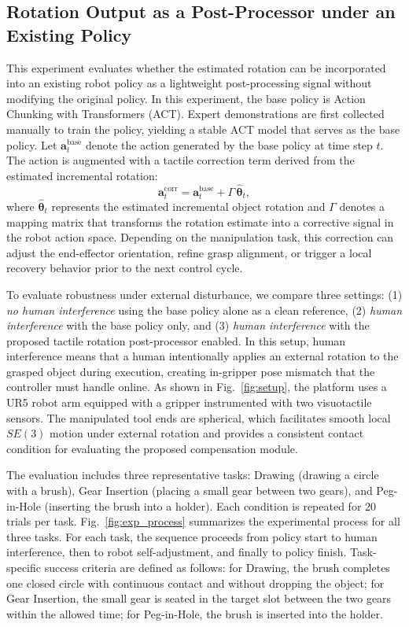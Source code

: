 \documentclass[letterpaper,10pt,journal,twoside]{IEEEtran}
\begin{document}
\subsection{Rotation Output as a Post-Processor under an Existing Policy}
\label{subsec:exp2}

This experiment evaluates whether the estimated rotation can be incorporated into an existing robot policy as a lightweight post-processing signal without modifying the original policy. In this experiment, the base policy is Action Chunking with Transformers (ACT). Expert demonstrations are first collected manually to train the policy, yielding a stable ACT model that serves as the base policy. Let $\mathbf{a}^{\mathrm{base}}_t$ denote the action generated by the base policy at time step $t$. The action is augmented with a tactile correction term derived from the estimated incremental rotation:
\begin{equation}
\mathbf{a}^{\mathrm{corr}}_t 
= 
\mathbf{a}^{\mathrm{base}}_t 
+ 
\Gamma \, \hat{\boldsymbol{\theta}}_t ,
\end{equation}
where $\hat{\boldsymbol{\theta}}_t$ represents the estimated incremental object rotation and $\Gamma$ denotes a mapping matrix that transforms the rotation estimate into a corrective signal in the robot action space. Depending on the manipulation task, this correction can adjust the end-effector orientation, refine grasp alignment, or trigger a local recovery behavior prior to the next control cycle.

To evaluate robustness under external disturbance, we compare three settings: (1) \emph{no human interference} using the base policy alone as a clean reference, (2) \emph{human interference} with the base policy only, and (3) \emph{human interference} with the proposed tactile rotation post-processor enabled. In this setup, human interference means that a human intentionally applies an external rotation to the grasped object during execution, creating in-gripper pose mismatch that the controller must handle online. As shown in Fig.~\ref{fig:setup}, the platform uses a UR5 robot arm equipped with a gripper instrumented with two visuotactile sensors. The manipulated tool ends are spherical, which facilitates smooth local $SE(3)$ motion under external rotation and provides a consistent contact condition for evaluating the proposed compensation module.

The evaluation includes three representative tasks: Drawing (drawing a circle with a brush), Gear Insertion (placing a small gear between two gears), and Peg-in-Hole (inserting the brush into a holder). Each condition is repeated for 20 trials per task. Fig.~\ref{fig:exp_process} summarizes the experimental process for all three tasks. For each task, the sequence proceeds from policy start to human interference, then to robot self-adjustment, and finally to policy finish.
Task-specific success criteria are defined as follows: for Drawing, the brush completes one closed circle with continuous contact and without dropping the object; for Gear Insertion, the small gear is seated in the target slot between the two gears within the allowed time; for Peg-in-Hole, the brush is inserted into the holder.
\end{document}
